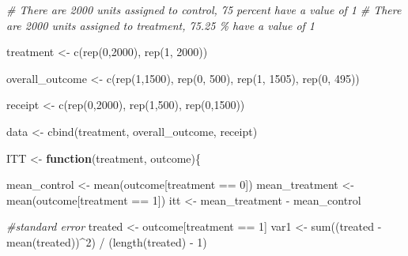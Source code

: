 \documentclass[
]{article}
\newenvironment{Shaded}{\begin{snugshade}}{\end{snugshade}}
\newcommand{\CommentTok}[1]{\textcolor[rgb]{0.56,0.35,0.01}{\textit{#1}}}
\newcommand{\ControlFlowTok}[1]{\textcolor[rgb]{0.13,0.29,0.53}{\textbf{#1}}}
\newcommand{\DecValTok}[1]{\textcolor[rgb]{0.00,0.00,0.81}{#1}}
\newcommand{\FunctionTok}[1]{\textcolor[rgb]{0.00,0.00,0.00}{#1}}
\newcommand{\NormalTok}[1]{#1}
\newcommand{\OtherTok}[1]{\textcolor[rgb]{0.56,0.35,0.01}{#1}}
\newcommand{\SpecialCharTok}[1]{\textcolor[rgb]{0.00,0.00,0.00}{#1}}
\begin{document}
\begin{Shaded}
\begin{Highlighting}[]
\CommentTok{\# There are 2000 units assigned to control, 75 percent have a value of 1 }
\CommentTok{\# There are 2000 units assigned to treatment, 75.25 \% have a value of 1}

\NormalTok{treatment }\OtherTok{\textless{}{-}} \FunctionTok{c}\NormalTok{(}\FunctionTok{rep}\NormalTok{(}\DecValTok{0}\NormalTok{,}\DecValTok{2000}\NormalTok{), }\FunctionTok{rep}\NormalTok{(}\DecValTok{1}\NormalTok{, }\DecValTok{2000}\NormalTok{))}

\NormalTok{overall\_outcome }\OtherTok{\textless{}{-}} \FunctionTok{c}\NormalTok{(}\FunctionTok{rep}\NormalTok{(}\DecValTok{1}\NormalTok{,}\DecValTok{1500}\NormalTok{), }\FunctionTok{rep}\NormalTok{(}\DecValTok{0}\NormalTok{, }\DecValTok{500}\NormalTok{), }\FunctionTok{rep}\NormalTok{(}\DecValTok{1}\NormalTok{, }\DecValTok{1505}\NormalTok{), }\FunctionTok{rep}\NormalTok{(}\DecValTok{0}\NormalTok{, }\DecValTok{495}\NormalTok{))}

\NormalTok{receipt }\OtherTok{\textless{}{-}} \FunctionTok{c}\NormalTok{(}\FunctionTok{rep}\NormalTok{(}\DecValTok{0}\NormalTok{,}\DecValTok{2000}\NormalTok{), }\FunctionTok{rep}\NormalTok{(}\DecValTok{1}\NormalTok{,}\DecValTok{500}\NormalTok{), }\FunctionTok{rep}\NormalTok{(}\DecValTok{0}\NormalTok{,}\DecValTok{1500}\NormalTok{))}

\NormalTok{data }\OtherTok{\textless{}{-}} \FunctionTok{cbind}\NormalTok{(treatment, overall\_outcome, receipt)}

\NormalTok{ITT }\OtherTok{\textless{}{-}} \ControlFlowTok{function}\NormalTok{(treatment, outcome)\{}
  
\NormalTok{  mean\_control }\OtherTok{\textless{}{-}} \FunctionTok{mean}\NormalTok{(outcome[treatment }\SpecialCharTok{==} \DecValTok{0}\NormalTok{])}
\NormalTok{  mean\_treatment }\OtherTok{\textless{}{-}} \FunctionTok{mean}\NormalTok{(outcome[treatment }\SpecialCharTok{==} \DecValTok{1}\NormalTok{])}
\NormalTok{  itt }\OtherTok{\textless{}{-}}\NormalTok{ mean\_treatment }\SpecialCharTok{{-}}\NormalTok{ mean\_control}
  
  \CommentTok{\#standard error}
\NormalTok{  treated }\OtherTok{\textless{}{-}}\NormalTok{ outcome[treatment }\SpecialCharTok{==} \DecValTok{1}\NormalTok{]}
\NormalTok{  var1 }\OtherTok{\textless{}{-}} \FunctionTok{sum}\NormalTok{((treated }\SpecialCharTok{{-}} \FunctionTok{mean}\NormalTok{(treated))}\SpecialCharTok{\^{}}\DecValTok{2}\NormalTok{) }\SpecialCharTok{/}\NormalTok{ (}\FunctionTok{length}\NormalTok{(treated) }\SpecialCharTok{{-}} \DecValTok{1}\NormalTok{)}
  

\end{Highlighting}
\end{Shaded}
\end{document}
